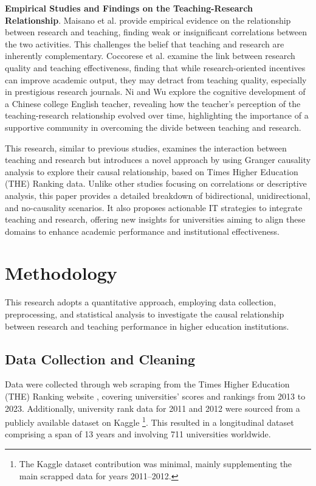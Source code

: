 \documentclass[a4paper, conference]{IEEEtran}
\begin{document}
\textbf{Empirical Studies and Findings on the Teaching-Research Relationship}. Maisano et al. \cite{maisano2023empirical} provide empirical evidence on the relationship between research and teaching, finding weak or insignificant correlations between the two activities. This challenges the belief that teaching and research are inherently complementary. Coccorese et al. \cite{Coccorese2024} examine the link between research quality and teaching effectiveness, finding that while research-oriented incentives can improve academic output, they may detract from teaching quality, especially in prestigious research journals. Ni and Wu \cite{ni2023research} explore the cognitive development of a Chinese college English teacher, revealing how the teacher’s perception of the teaching-research relationship evolved over time, highlighting the importance of a supportive community in overcoming the divide between teaching and research.  

This research, similar to previous studies, examines the interaction between teaching and research but introduces a novel approach by using Granger causality analysis to explore their causal relationship, based on Times Higher Education (THE) Ranking data. Unlike other studies focusing on correlations or descriptive analysis, this paper provides a detailed breakdown of bidirectional, unidirectional, and no-causality scenarios. It also proposes actionable IT strategies to integrate teaching and research, offering new insights for universities aiming to align these domains to enhance academic performance and institutional effectiveness.  

\section{Methodology}
\label{sec:methodology}

This research adopts a quantitative approach, employing data collection, preprocessing, and statistical analysis to investigate the causal relationship between research and teaching performance in higher education institutions.

\subsection{Data Collection and Cleaning}

Data were collected through web scraping from the Times Higher Education (THE) Ranking website \cite{the2024}, covering universities' scores and rankings from 2013 to 2023. Additionally, university rank data for 2011 and 2012 were sourced from a publicly available dataset on Kaggle \cite{ONeil_2020}\footnote{The Kaggle dataset contribution was minimal, mainly supplementing the main scrapped data for years 2011--2012.}. This resulted in a longitudinal dataset comprising a span of 13 years and involving 711 universities worldwide.
\end{document}
